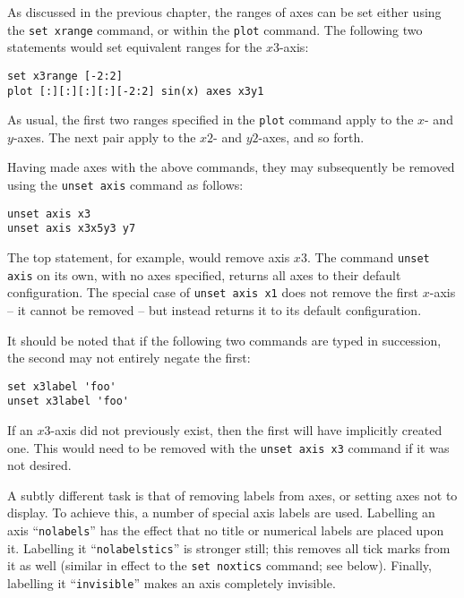 As discussed in the previous chapter, the ranges of axes can be set either
using the {\tt set xrange} command, or within the {\tt plot} command. The following two
statements would set equivalent ranges for the $x3$-axis:

\begin{verbatim}
set x3range [-2:2]
plot [:][:][:][:][-2:2] sin(x) axes x3y1
\end{verbatim}

\noindent As usual, the first two ranges specified in the {\tt plot} command
apply to the $x$- and $y$-axes. The next pair apply to the $x2$- and $y2$-axes,
and so forth.

\label{axis_removal} Having made axes with the above commands, they may
subsequently be removed using the {\tt unset axis} command as follows:

\begin{verbatim}
unset axis x3
unset axis x3x5y3 y7
\end{verbatim}

\noindent The top statement, for example, would remove axis $x3$. The command
{\tt unset axis} on its own, with no axes specified, returns all axes to
their default configuration.  The special case of {\tt unset axis x1} does
not remove the first $x$-axis -- it cannot be removed -- but instead returns it
to its default configuration.

It should be noted that if the following two commands are typed in succession,
the second may not entirely negate the first:

\begin{verbatim}
set x3label 'foo'
unset x3label 'foo'
\end{verbatim}

\noindent If an $x3$-axis did not previously exist, then the first will have
implicitly created one. This would need to be removed with the {\tt unset
axis x3} command if it was not desired.

A subtly different task is that of removing labels from axes, or setting axes
not to display. To achieve this, a number of special axis labels are used.
Labelling an axis ``{\tt nolabels}'' has the effect that no title or numerical
labels are placed upon it. Labelling it\label{nolabelstics}
``{\tt nolabelstics}'' is stronger still; this removes all tick marks from it as well
(similar in effect to the {\tt set noxtics} command; see below). Finally,
labelling it ``{\tt invisible}'' makes an axis completely invisible.

